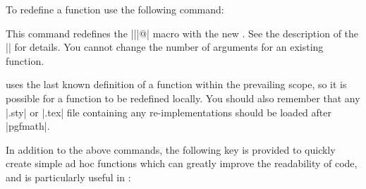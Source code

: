 To redefine a function use the following command:

\begin{command}{\pgfmathredeclarefunction{}}
    This command redefines the |\pgfmath||@| macro with the
    new . See the description of the
    |\pgfmathdeclarefunction| for details. You cannot change the number of
    arguments for an existing function.
\begin{codeexample}[]
\makeatletter
{}
\pgfmathresult
{}
\pgfmathresult
\makeatother
\end{codeexample}
\end{command}

    \pgfname{} uses the last known definition of a function within the
    prevailing scope, so it is possible for a function to be redefined locally.
    You should also remember that any |.sty| or |.tex| file containing any
    re-implementations should be loaded after |pgfmath|.

    In addition to the above commands, the following key is provided to quickly
    create simple ad hoc functions which can greatly improve the readability of
    code, and is particularly useful in \tikzname{}:

